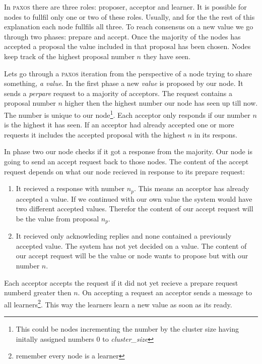 In \textsc{paxos} there are three roles: proposer, acceptor and learner. It is possible for nodes to fullfil only one or two of these roles. Usually, and for the the rest of this explanation each node fullfils all three. To reach consensus on a new value we go through two phases: prepare and accept. Once the majority of the nodes has accepted a proposal the value included in that proposal has been chosen. Nodes keep track of the highest proposal number $n$ they have seen. 

Lets go through a \textsc{paxos} iteration from the perspective of a node trying to share something, \textit{a value}. In the first phase a new \textit{value} is proposed by our node. It sends a \textit{perpare} request to a majority of acceptors. The request contains a proposal number $n$ higher then the highest number our node has seen up till now. The number is unique to our node\footnote{This could be nodes incrementing the number by the cluster size having initally assigned numbers $0$ to \textit{cluster\_size}}. Each acceptor only responds if our number $n$ is the highest it has seen. If an acceptor had already accepted one or more requests it includes the accepted proposal with the highest $n$ in its respons.

In phase two our node checks if it got a response from the majority. Our node is going to send an accept request back to those nodes. The content of the accept request depends on what our node recieved in response to its prepare request:
%
\begin{enumerate}
	\item It recieved a response with number $n_p$. This means an acceptor has already accepted a value. If we continued with our own value the system would have two different accepted values. Therefor the content of our accept request will be the value from proposal $n_p$.
	\item It recieved only acknowleding replies and none contained a previously accepted value. The system has not yet decided on a value. The content of our accept request will be the value or node wants to propose but with our number $n$.
\end{enumerate}
%
Each acceptor accepts the request if it did not yet recieve a prepare request numberd greater then $n$. On accepting a request an acceptor sends a message to all learners\footnote{remember every node is a learner}. This way the learners learn a new value as soon as its ready.


